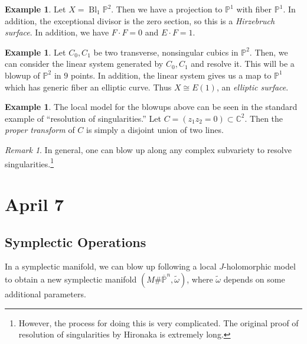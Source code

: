 \documentclass[leqno, openany]{memoir}
\theoremstyle{definition}
\newtheorem{exm}[thm]{Example}
\theoremstyle{remark}
\newtheorem{rmk}[thm]{Remark}
\theoremstyle{plain}
\theoremstyle{definition}
\theoremstyle{remark}
\renewcommand{\C}{\mathbb{C}}
\renewcommand{\P}{\mathbb{P}}
\DeclareMathOperator{\Bl}{Bl} %
\begin{document}
    \begin{exm}
        Let $X = \Bl_1 \P^2$. Then we have a projection to $\P^1$ with fiber $\P^1$. In addition, the exceptional divisor is the zero section, so this is a \textit{Hirzebruch surface}. In addition, we have $F \cdot F = 0$ and $E \cdot F = 1$.
    \end{exm}

    \begin{exm}
        Let $C_0, C_1$ be two transverse, nonsingular cubics in $\P^2$. Then, we can consider the linear system generated by $C_0, C_1$ and resolve it. This will be a blowup of $\P^2$ in $9$ points. In addition, the linear system gives us a map to $\P^1$ which has generic fiber an elliptic curve. Thus $X \cong E(1)$, an \textit{elliptic surface}.
    \end{exm}

    \begin{exm}
        The local model for the blowups above can be seen in the standard example of ``resolution of singularities.'' Let $C = (z_1z_2 = 0) \subset \C^2$. Then the \textit{proper transform} of $C$ is simply a disjoint union of two lines.
    \end{exm}

    \begin{rmk}
        In general, one can blow up along any complex subvariety to resolve singularities.\footnote{However, the process for doing this is very complicated. The original proof of resolution of singularities by Hironaka is extremely long.}
    \end{rmk}
    
    \chapter{April 7}%
    \label{cha:april_7}
    
    \section{Symplectic Operations}%
    \label{sec:symplectic_operations}
    
    In a symplectic manifold, we can blow up following a local $J$-holomorphic model to obtain a new symplectic manifold $(M \# \overline{\P}^n, \widetilde{\omega})$, where $\widetilde{\omega}$ depends on some additional parameters.
\end{document}
